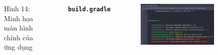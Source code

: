 \documentclass{beamer}
\begin{document}
\begin{frame}
\begin{columns}
\begin{figure}
            \caption{\centering\tiny{Hình 14: Minh họa màn hình chính của ứng dụng}}
        \end{figure}
        \indent \textbf{\texttt{build.gradle}}
        \begin{figure}
            \centering
            \includegraphics[width=\textwidth]{images/13.png}
        \end{figure}
    \end{columns}
\end{frame}
\end{document}
